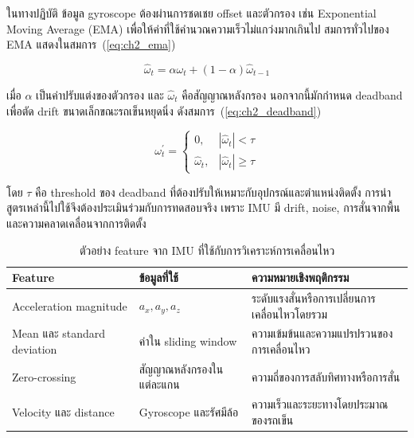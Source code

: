 ในทางปฏิบัติ ข้อมูล gyroscope ต้องผ่านการชดเชย offset และตัวกรอง เช่น Exponential Moving Average (EMA) เพื่อให้ค่าที่ใช้คำนวณความเร็วไม่แกว่งมากเกินไป สมการทั่วไปของ EMA แสดงในสมการ~(\ref{eq:ch2_ema})

\begin{equation}
    \hat{\omega}_{t} = \alpha \omega_t + (1-\alpha)\hat{\omega}_{t-1}
    \label{eq:ch2_ema}
\end{equation}

เมื่อ $\alpha$ เป็นค่าปรับแต่งของตัวกรอง และ $\hat{\omega}_{t}$ คือสัญญาณหลังกรอง นอกจากนี้มักกำหนด deadband เพื่อตัด drift ขนาดเล็กขณะรถเข็นหยุดนิ่ง ดังสมการ~(\ref{eq:ch2_deadband})

\begin{equation}
    \omega^{'}_t =
    \begin{cases}
        0, & |\hat{\omega}_t| < \tau \\
        \hat{\omega}_t, & |\hat{\omega}_t| \geq \tau
    \end{cases}
    \label{eq:ch2_deadband}
\end{equation}

โดย $\tau$ คือ threshold ของ deadband ที่ต้องปรับให้เหมาะกับอุปกรณ์และตำแหน่งติดตั้ง การนำสูตรเหล่านี้ไปใช้จึงต้องประเมินร่วมกับการทดสอบจริง เพราะ IMU มี drift, noise, การสั่นจากพื้น และความคลาดเคลื่อนจากการติดตั้ง

\begin{table}[htbp]
    \centering
    \caption{ตัวอย่าง feature จาก IMU ที่ใช้กับการวิเคราะห์การเคลื่อนไหว}
    \label{tab:ch2_imu_features}
    \small
    \begin{tabular}{>{\raggedright\arraybackslash}p{}
                    >{\raggedright\arraybackslash}p{}
                    >{\raggedright\arraybackslash}p{}}
        \toprule
        Feature & ข้อมูลที่ใช้ & ความหมายเชิงพฤติกรรม \\ \midrule
        Acceleration magnitude & $a_x,a_y,a_z$ & ระดับแรงสั่นหรือการเปลี่ยนการเคลื่อนไหวโดยรวม \\ \midrule
        Mean และ standard deviation & ค่าใน sliding window & ความเข้มข้นและความแปรปรวนของการเคลื่อนไหว \\ \midrule
        Zero-crossing & สัญญาณหลังกรองในแต่ละแกน & ความถี่ของการสลับทิศทางหรือการสั่น \\ \midrule
        Velocity และ distance & Gyroscope และรัศมีล้อ & ความเร็วและระยะทางโดยประมาณของรถเข็น \\ \bottomrule
    \end{tabular}
\end{table}

